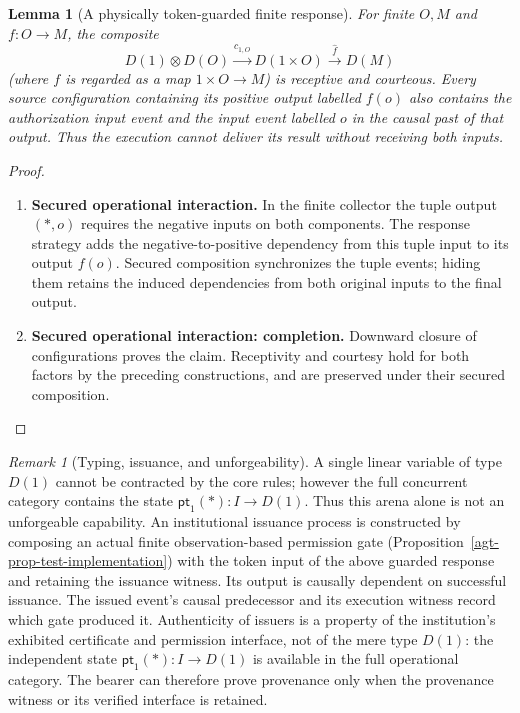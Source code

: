 \documentclass[11pt,a4paper]{article}
\numberwithin{equation}{section}
\newtheorem{lemma}[theorem]{Lemma}
\theoremstyle{definition}
\theoremstyle{remark}
\newtheorem{remark}[theorem]{Remark}
\theoremstyle{plain}
\begin{document}
\begin{lemma}[A physically token-guarded finite response]
\label{agt-lem-token-guard}
For finite $O,M$ and $f:O\to M$, the composite
\[
 D(1)\otimes D(O)\xrightarrow{c_{1,O}}D(1\times O)
 \xrightarrow{\widehat f}D(M)
\]
(where $f$ is regarded as a map $1\times O\to M$) is receptive and
courteous. Every source configuration containing its positive output
labelled $f(o)$ also contains the authorization input event and the
input event labelled $o$ in the causal past of that output. Thus the
execution cannot deliver its result without receiving both inputs.
\end{lemma}
\begin{proof}
\leavevmode
\begin{enumerate}[label=\textup{(\arabic*)},leftmargin=*,itemsep=4pt,topsep=3pt]
  \item \textbf{Secured operational interaction.} In the finite collector the tuple output $(\ast,o)$ requires the
negative inputs on both components. The response strategy adds the
negative-to-positive dependency from this tuple input to its output
$f(o)$. Secured composition synchronizes the tuple events; hiding
them retains the induced dependencies from both original inputs to the
final output.
  \item \textbf{Secured operational interaction: completion.} Downward closure of configurations proves the claim. Receptivity and courtesy hold for both factors by the preceding constructions,
and are preserved under their secured composition.
\end{enumerate}
\end{proof}
\begin{remark}[Typing, issuance, and unforgeability]
A single linear variable of type $D(1)$ cannot be contracted by the core
rules; however the full concurrent category contains the state
$\mathsf{pt}_1(\ast):I\to D(1)$. Thus this arena alone is not an
unforgeable capability. An institutional issuance process is constructed
by composing an actual finite observation-based permission gate
(Proposition~\ref{agt-prop-test-implementation}) with the token input of
the above guarded response and retaining the issuance witness. Its output
is causally dependent on successful issuance. The issued event's causal predecessor and its execution witness record
which gate produced it.  Authenticity of issuers is a property of the
institution's exhibited certificate and permission interface, not of the
mere type $D(1)$: the independent state
$\mathsf{pt}_1(\ast):I\to D(1)$ is available in the full operational
category.  The bearer can therefore prove provenance only when the
provenance witness or its verified interface is retained.
\end{remark}
\end{document}
